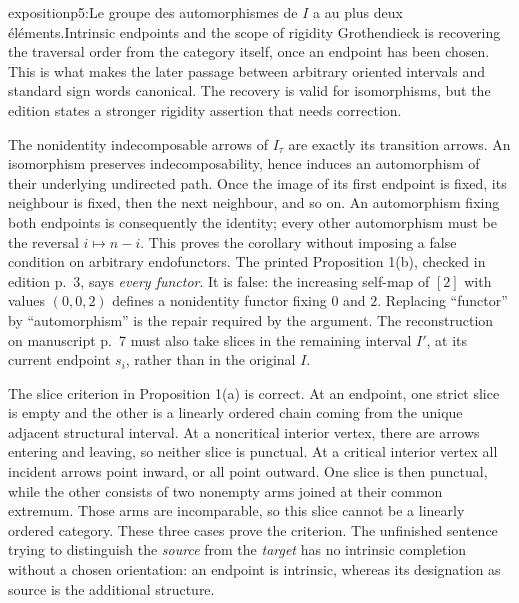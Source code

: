 \begin{dcomment}{exposition}{p5:Le groupe des automorphismes de $I$ a au plus deux éléments.}{Intrinsic endpoints and the scope of rigidity}
Grothendieck is recovering the traversal order from the category itself, once an endpoint has been chosen. This is what makes the later passage between arbitrary oriented intervals and standard sign words canonical. The recovery is valid for isomorphisms, but the edition states a stronger rigidity assertion that needs correction.

The nonidentity indecomposable arrows of $I_\tau$ are exactly its transition arrows. An isomorphism preserves indecomposability, hence induces an automorphism of their underlying undirected path. Once the image of its first endpoint is fixed, its neighbour is fixed, then the next neighbour, and so on. An automorphism fixing both endpoints is consequently the identity; every other automorphism must be the reversal $i\mapsto n-i$. This proves the corollary without imposing a false condition on arbitrary endofunctors. The printed Proposition 1(b), checked in edition p.~3, says \emph{every functor}. It is false: the increasing self-map of $[2]$ with values $(0,0,2)$ defines a nonidentity functor fixing $0$ and $2$. Replacing ``functor'' by ``automorphism'' is the repair required by the argument. The reconstruction on manuscript p.~7 must also take slices in the remaining interval $I'$, at its current endpoint $s_i$, rather than in the original $I$.

The slice criterion in Proposition 1(a) is correct. At an endpoint, one strict slice is empty and the other is a linearly ordered chain coming from the unique adjacent structural interval. At a noncritical interior vertex, there are arrows entering and leaving, so neither slice is punctual. At a critical interior vertex all incident arrows point inward, or all point outward. One slice is then punctual, while the other consists of two nonempty arms joined at their common extremum. Those arms are incomparable, so this slice cannot be a linearly ordered category. These three cases prove the criterion. The unfinished sentence trying to distinguish the \emph{source} from the \emph{target} has no intrinsic completion without a chosen orientation: an endpoint is intrinsic, whereas its designation as source is the additional structure.


\end{dcomment}
